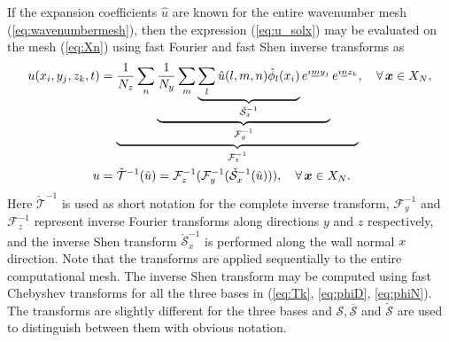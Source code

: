 \documentclass[11pt, oneside]{article}
\newcommand{\N}[1]{\check{#1}}
\newcommand{\D}[1]{\overline{#1}}
\begin{document}
If the expansion coefficients $\hat{u}$  are known for the entire wavenumber 
mesh (\ref{eq:wavenumbermesh}), then the expression (\ref{eq:u_solx}) may be 
evaluated on the mesh (\ref{eq:Xn}) using fast Fourier and fast Shen inverse 
transforms as
\begin{align}
u(x_i, y_j, z_k, t) &= \underbrace{\frac{1}{N_z}\sum_n 
\underbrace{\frac{1}{N_y} \sum_m \underbrace{\sum_l 
\hat{u}(l,m,n)\N{\phi}_l(x_i)}_{\N{\mathcal{S}}_x^{-1}} e^{\imath \underline{m} 
y_j}}_{\mathcal{F}_y^{-1}} e^{\imath \underline{n} z_k}}_{\mathcal{F}_z^{-1}} , 
\quad \forall \, \bm{x} \in X_N, \notag \\
  u &= \N{\mathcal{T}}^{-1}(\hat{u}) =  \mathcal{F}^{-1}_z (\mathcal{F}^{-1}_y 
  (\N{\mathcal{S}}^{-1}_x (\hat{u}))), \quad \forall \, \bm{x} \in X_N.  
  \label{eq:ifft} 
\end{align}
Here $\N{\mathcal{T}}^{-1}$ is used as short notation for the complete inverse 
transform, $\mathcal{F}_{y}^{-1}$ and $\mathcal{F}_{z}^{-1}$ represent inverse 
Fourier transforms along directions $y$ and $z$ respectively, and the inverse 
Shen transform $\N{\mathcal{S}}_{x}^{-1}$ is performed along the wall normal 
$x$ direction. Note that the transforms are applied sequentially to the entire 
computational mesh. The inverse Shen transform may be computed using fast 
Chebyshev transforms for all the three bases in (\ref{eq:Tk}, \ref{eq:phiD}, 
\ref{eq:phiN}). The transforms are slightly different for the three bases and 
${\mathcal{S}}, \D{\mathcal{S}}$ and $\N{\mathcal{S}}$ are used to distinguish 
between them with obvious notation. 
\end{document}
